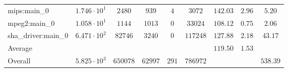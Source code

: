 \begin{tabular}{|l|c|c|c|c|c|c|c|c|}
mips:main\_0            & $ 1.746 \cdot 10^{1}  $ & $ 2480   $ & $ 939   $ & $ 4   $ & $ 3072   $ & $ 142.03      $ & $ 2.96    $ & $ 5.20    $ \\
mpeg2:main\_0           & $ 1.058 \cdot 10^{1}  $ & $ 1144   $ & $ 1013  $ & $ 0   $ & $ 33024  $ & $ 108.12      $ & $ 0.75    $ & $ 2.06    $ \\
sha\_driver:main\_0     & $ 6.471 \cdot 10^{2}  $ & $ 82746  $ & $ 3240  $ & $ 0   $ & $ 117248 $ & $ 127.88      $ & $ 2.18    $ & $ 43.17   $ \\
\hline
Average                 & $                     $ & $        $ & $       $ & $     $ & $        $ & $ 119.50      $ & $ 1.53    $ & $         $ \\
\hline
Overall                 & $ 5.825 \cdot 10^{3}  $ & $ 650078 $ & $ 62997 $ & $ 291 $ & $ 786972 $ & $             $ & $         $ & $ 538.39  $ \\
\hline
\end{tabular}
